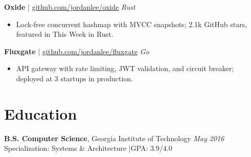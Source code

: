 \documentclass[11pt,a4paper]{article}
\begin{document}
\noindent\textbf{Oxide} \textcolor{accent}{|} \href{https://github.com/jordanlee/oxide}{github.com/jordanlee/oxide} \quad \textit{Rust}
\begin{itemize}
  \item Lock-free concurrent hashmap with MVCC snapshots; 2.1k GitHub stars, featured in This Week in Rust.
\end{itemize}

\noindent\textbf{Fluxgate} \textcolor{accent}{|} \href{https://github.com/jordanlee/fluxgate}{github.com/jordanlee/fluxgate} \quad \textit{Go}
\begin{itemize}
  \item API gateway with rate limiting, JWT validation, and circuit breaker; deployed at 3 startups in production.
\end{itemize}

\section{Education}
\textbf{B.S. Computer Science}, Georgia Institute of Technology \hfill \textit{May 2016}\\
Specialization: Systems \& Architecture \quad|\quad GPA: 3.9/4.0
\end{document}
